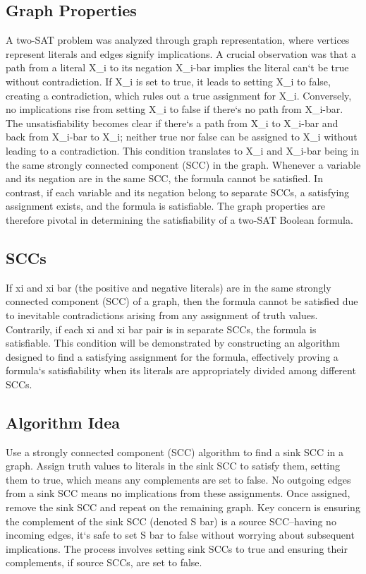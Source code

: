 \subsection*{Graph Properties}
A two-SAT problem was analyzed through graph representation, where vertices represent literals and edges signify implications.
A crucial observation was that a path from a literal X\_i to its negation X\_i-bar implies the literal can`t be true without contradiction.
If X\_i is set to true, it leads to setting X\_i to false, creating a contradiction, which rules out a true assignment for X\_i.
Conversely, no implications rise from setting X\_i to false if there`s no path from X\_i-bar.
The unsatisfiability becomes clear if there`s a path from X\_i to X\_i-bar and back from X\_i-bar to X\_i; neither true nor false can be assigned to X\_i without leading to a contradiction.
This condition translates to X\_i and X\_i-bar being in the same strongly connected component (SCC) in the graph.
Whenever a variable and its negation are in the same SCC, the formula cannot be satisfied.
In contrast, if each variable and its negation belong to separate SCCs, a satisfying assignment exists, and the formula is satisfiable.
The graph properties are therefore pivotal in determining the satisfiability of a two-SAT Boolean formula.

\subsection*{SCCs}
If xi and xi bar (the positive and negative literals) are in the same strongly connected component (SCC) of a graph, then the formula cannot be satisfied due to inevitable contradictions arising from any assignment of truth values.
Contrarily, if each xi and xi bar pair is in separate SCCs, the formula is satisfiable.
This condition will be demonstrated by constructing an algorithm designed to find a satisfying assignment for the formula, effectively proving a formula`s satisfiability when its literals are appropriately divided among different SCCs.

\subsection*{Algorithm Idea}
Use a strongly connected component (SCC) algorithm to find a sink SCC in a graph.
Assign truth values to literals in the sink SCC to satisfy them, setting them to true, which means any complements are set to false.
No outgoing edges from a sink SCC means no implications from these assignments.
Once assigned, remove the sink SCC and repeat on the remaining graph.
Key concern is ensuring the complement of the sink SCC (denoted S bar) is a source SCC--having no incoming edges, it`s safe to set S bar to false without worrying about subsequent implications.
The process involves setting sink SCCs to true and ensuring their complements, if source SCCs, are set to false.

